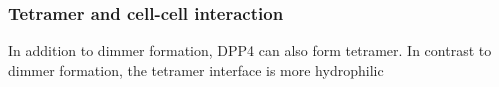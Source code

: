 \subsubsection{Tetramer and cell-cell interaction}

In addition to dimmer formation, DPP4 can also form tetramer. In contrast to dimmer formation, the tetramer interface is more hydrophilic 